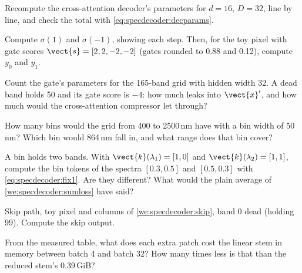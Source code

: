 \begin{checkyourself}
\item\label{ex:specdecoder:1} Recompute the cross-attention decoder's parameters for $d = 16$, $D = 32$, line by line, and check the total with \cref{eq:specdecoder:decparams}.
\item\label{ex:specdecoder:2} Compute $\sigma(1)$ and $\sigma(-1)$, showing each step. Then, for the toy pixel with gate scores $\vect{s} = [2, 2, -2, -2]$ (gates rounded to 0.88 and 0.12), compute $y_0$ and $y_1$.
\item\label{ex:specdecoder:3} Count the gate's parameters for the 165-band grid with hidden width 32. A dead band holds 50 and its gate score is $-4$: how much leaks into $\vect{x}'$, and how much would the cross-attention compressor let through?
\item\label{ex:specdecoder:4} How many bins would the grid from 400 to 2500\,nm have with a bin width of 50\,nm? Which bin would 864\,nm fall in, and what range does that bin cover?
\item\label{ex:specdecoder:5} A bin holds two bands. With $\vect{k}(\lambda_1) = [1, 0]$ and $\vect{k}(\lambda_2) = [1, 1]$, compute the bin tokens of the spectra $[0.3, 0.5]$ and $[0.5, 0.3]$ with \cref{eq:specdecoder:fix1}. Are they different? What would the plain average of \cref{we:specdecoder:sumloss} have said?
\item\label{ex:specdecoder:6} Skip path, toy pixel and columns of \cref{we:specdecoder:skip}, band 0 dead (holding 99). Compute the skip output.
\item\label{ex:specdecoder:7} From the measured table, what does each extra patch cost the linear stem in memory between batch 4 and batch 32? How many times less is that than the reduced stem's 0.39\,GiB?
\end{checkyourself}

